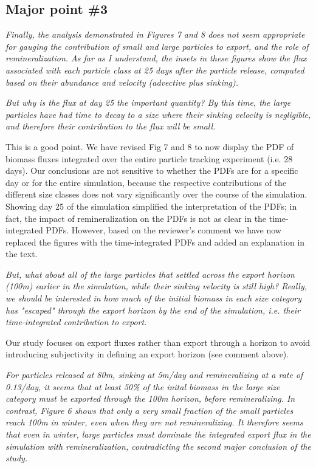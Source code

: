 \documentclass[12pt,letter]{article}
\begin{document}
\subsection*{Major point \#3}
 \textit{Finally, the analysis demonstrated in Figures 7 and 8 does not seem appropriate for gauging the contribution of small and large particles to export, and the role of remineralization. As far as I understand, the insets in these figures show the flux associated with each particle class at 25 days after the particle release, computed based on their abundance and velocity (advective plus sinking).\\}


 \textit{But why is the flux at day 25 the important quantity? By this time, the large particles have had time to decay to a size where their sinking velocity is negligible, and therefore their contribution to the flux will be small.}

 {\color{blue}
 This is a good point. We have revised Fig 7 and 8 to now display the PDF of biomass fluxes integrated over the entire particle tracking experiment (i.e. 28 days). Our conclusions are not sensitive to whether the PDFs are for a specific day or for the entire simulation, because the respective contributions of the different size classes does not vary significantly over the course of the simulation. Showing day 25 of the simulation simplified the interpretation of the PDFs; in fact, the impact of remineralization on the PDFs is not as clear in the time-integrated PDFs. However, based on the reviewer's comment we have now replaced the figures with the time-integrated PDFs and  added an explanation in the text.\\}

 \textit{But, what about all of the large particles that settled across the export horizon (100m) earlier in the simulation, while their sinking velocity is still high? Really, we should be interested in how much of the initial biomass in each size category has "escaped" through the export horizon by the end of the simulation, i.e. their time-integrated contribution to export.}

 {\color{blue}
Our study focuses on export fluxes rather than export through a horizon to avoid introducing subjectivity in defining an export horizon (see comment above).\\}

\textit{For particles released at 80m, sinking at 5m/day and remineralizing at a rate of 0.13/day, it seems that at least 50\% of the inital biomass in the large size category must be exported through the 100m horizon, before remineralizing. In contrast, Figure 6 shows that only a very small fraction of the small particles reach 100m in winter, even when they are not remineralizing. It therefore seems that even in winter, large particles must dominate the integrated export flux in the simulation with remineralization, contradicting the second major conclusion of the study.}
\end{document}
